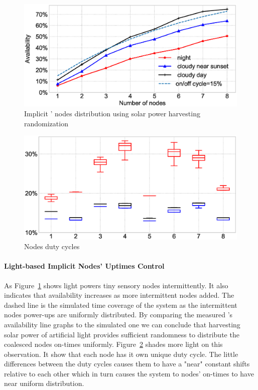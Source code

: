 \begin{figure}[t]
		\centering
		\includegraphics[width=\columnwidth]{figures/sysAvailability}
		\caption{Implicit \fullsys' nodes distribution using solar power harvesting randomization}
		\label{fig:solarPwrCoIS}
\end{figure} 
%
\begin{figure}[t]
		\centering
		\includegraphics[width=\columnwidth]{figures/sysDutyCycles}
		\caption{ Nodes duty cycles}
		\label{fig:sysDutyCycle}
\end{figure} 

\paragraph{Light-based Implicit Nodes' Uptimes Control}
As Figure~\ref{fig:solarPwrCoIS} shows light powers tiny sensory nodes intermittently. It also indicates that \sys availability increases as more intermittent nodes added. The dashed line is the simulated time coverage of the system as the intermittent nodes power-ups are uniformly distributed. By comparing the measured \sys's availability line graphs to the simulated one we can conclude that harvesting solar power of artificial light provides sufficient randomness to distribute the coalesced nodes on-times uniformly. Figure~\ref{fig:sysDutyCycle} shades more light on this observation. It show that each node has it own unique duty cycle. The little differences between the duty cycles causes them to have a "near" constant shifts relative to each other which in turn causes the system to nodes' on-times to have near uniform distribution.

